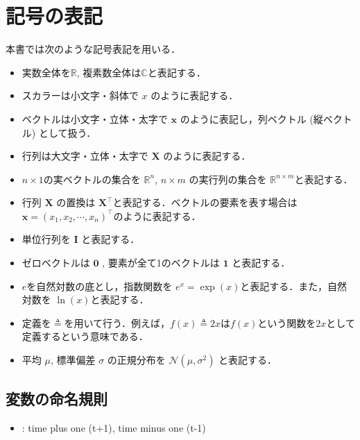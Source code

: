 \section{記号の表記}
本書では次のような記号表記を用いる．
\begin{itemize}
\item 実数全体を$\mathbb{R}$, 複素数全体は$\mathbb{C}$と表記する．
\item スカラーは小文字・斜体で $x$ のように表記する．
\item ベクトルは小文字・立体・太字で $\mathbf{x}$ のように表記し，列ベクトル (縦ベクトル) として扱う．
\item 行列は大文字・立体・太字で $\mathbf{X}$ のように表記する．
\item $n\times 1$の実ベクトルの集合を $\mathbb{R}^n$, $n\times m$ の実行列の集合を $\mathbb{R}^{n\times m}$と表記する．
\item 行列 $\mathbf{X}$ の置換は $\mathbf{X}^\top$と表記する．ベクトルの要素を表す場合は $\mathbf{x} = (x_1, x_2,\cdots, x_n)^\top$のように表記する．
\item 単位行列を $\mathbf{I}$ と表記する．
\item ゼロベクトルは $\mathbf{0}$ , 要素が全て1のベクトルは $\mathbf{1}$ と表記する．  
\item $e$を自然対数の底とし，指数関数を $e^x=\exp(x)$と表記する．また，自然対数を $\ln(x)$と表記する．
\item 定義を$\triangleq$を用いて行う．例えば，$f(x)\triangleq2x$は$f(x)$という関数を$2x$として定義するという意味である．
\item 平均 $\mu$, 標準偏差 $\sigma$ の正規分布を $\mathcal{N}(\mu, \sigma^2)$ と表記する．
\end{itemize}
\subsection{変数の命名規則}
\begin{itemize}
\item {} : time plus one (t+1), time minus one (t-1)
\end{itemize}
